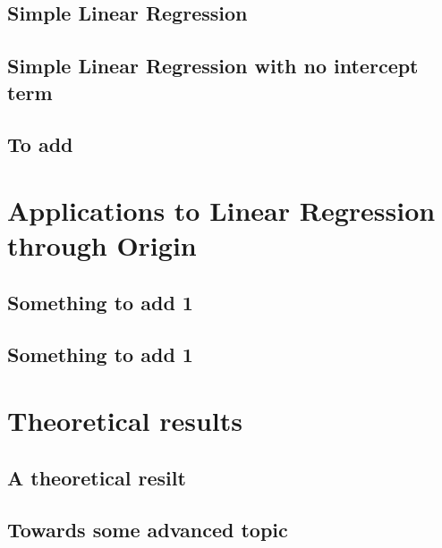\documentclass[12pt,a4paper,oneside]{book} %
\begin{document}
	\section{Simple Linear Regression}

	\section{Simple Linear Regression with no intercept term}
	
	\section{To add}	
	
	
	\chapter{Applications to Linear Regression through Origin} %

	\section{Something to add 1} 
	
	\section{Something to add 1} 

	\chapter{Theoretical results} %
	
	\section{A theoretical resilt}
	
	\section{Towards some advanced topic}
\end{document}
